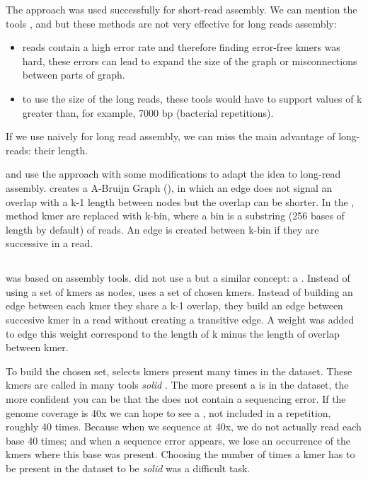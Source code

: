\documentclass[main]{subfiles}
\begin{document}
The \DBG approach was used successfully for short-read assembly. We can mention the tools  \cite{spades},  \cite{minia} and \cite{megahit} but these methods are not very effective for long reads assembly:
\begin{itemize}
    \item reads contain a high error rate and therefore finding error-free kmers was hard, these errors can lead to expand the size of the graph or misconnections between parts of graph.
    \item to use the size of the long reads, these tools would have to support values of k greater than, for example, 7000 bp (bacterial repetitions).
\end{itemize}

If we use \DBG naively for long read assembly, we can miss the main advantage of long-reads: their length.

\flye and \wtdbg use the \DBG approach with some modifications to adapt the idea to long-read assembly. \flye creates a A-Bruijn Graph (), in which an edge does not signal an overlap with a k-1 length between nodes but the overlap can be shorter. In the \wtdbg, method kmer are replaced with k-bin, where a bin is a substring (256 bases of length by default) of reads. An edge is created between k-bin if they are successive in a read.

\subsection{\flye}

\flye\cite{Flye} was based on \abruijn\cite{abruijn} assembly tools. \abruijn did not use a \DBG but a similar concept: a . Instead of using a set of kmers as nodes,  uses a set of chosen kmers. Instead of building an edge between each kmer they share a k-1 overlap, they build an edge between succesive kmer in a read without creating a transitive edge. A weight was added to edge this weight correspond to the length of k minus the length of overlap between kmer.

To build the chosen \kmers set, \abruijn selects kmers present many times in the dataset. These kmers are called in many tools \textit{solid} \kmers. The more present a \kmer is in the dataset, the more confident you can be that the \kmer does not contain a sequencing error. If the genome coverage is 40x we can hope to see a \kmer, not included in a repetition, roughly 40 times. Because when we sequence at 40x, we do not actually read each base 40 times; and when a sequence error appears, we lose an occurrence of the kmers where this base was present. Choosing the number of times a kmer has to be present in the dataset to be \textit{solid} was a difficult task.
\end{document}
